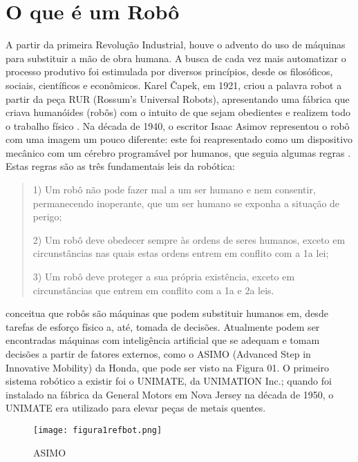 \section{O que é um Robô}\label{sec:oque_robo}
A partir da primeira Revolução Industrial, houve o advento do uso de máquinas para substituir a mão de obra humana. A busca de cada vez mais automatizar o processo produtivo foi estimulada por diversos princípios, desde os filosóficos, sociais, científicos e  econômicos. Karel Čapek, em 1921, criou a palavra robot a partir da peça RUR (Rossum's Universal Robots), apresentando uma fábrica que criava humanóides (robôs) com o intuito de que sejam obedientes e realizem todo o trabalho físico \cite{wellek}. Na década de 1940, o escritor Isaac Asimov representou o robô com uma imagem um pouco diferente: este foi reapresentado como um dispositivo mecânico com um cérebro programável por humanos, que seguia algumas regras \cite{asimov}. Estas regras são as três fundamentais leis da robótica:

\begin{quote}
1) Um robô não pode fazer mal a um ser humano e nem consentir, permanecendo inoperante, que um ser humano se exponha a situação de perigo;

2) Um robô deve obedecer sempre às ordens de seres humanos, exceto em circunstâncias nas quais estas ordens entrem em conflito com a 1a lei; 

3) Um robô deve proteger a sua própria existência, exceto em circunstâncias que entrem em conflito com a 1a e 2a leis. 
\end{quote}	

\cite{siciliano2010} conceitua que robôs são máquinas que podem substituir humanos em, desde tarefas de esforço físico a, até, tomada de decisões. Atualmente podem ser encontradas máquinas com inteligência artificial que se adequam e tomam decisões a partir de fatores externos, como o ASIMO (Advanced Step in Innovative Mobility) da Honda, que pode ser visto na Figura 01. O primeiro sistema robótico a existir foi o UNIMATE, da UNIMATION Inc.; quando foi instalado na fábrica da General Motors em Nova Jersey na década de 1950, o UNIMATE era utilizado para elevar peças de metais quentes.

\begin{figure}[h!]												
	\centering												
	\texttt{[image: figura1refbot.png]}			
	\caption{ASIMO}		
	\label{img:denavit}	
\end{figure}


